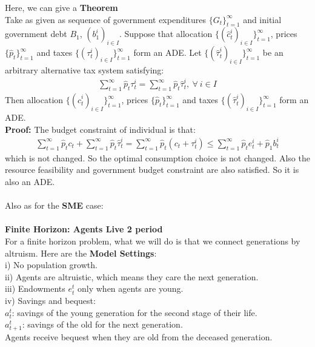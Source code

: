 \documentclass{article}
\begin{document}
Here, we can give a \textbf{Theorem}\\
Take as given as sequence of government expenditures $\{G_t\}^\infty_{t=1}$ and initial government debt $B_1$, $(b^i_1)_{i \in I}$. Suppose that allocation $\{(\hat{c}^i_t)_{i \in I}\}^\infty_{t=1}$, prices $\{\hat{p}_t\}^\infty_{t=1}$ and taxes $\{(\tau^i_t)_{i \in I}\}^\infty_{t=1}$ form an ADE. Let $\{(\hat{\tau}^i_t)_{i \in I}\}^\infty_{t=1}$ be an arbitrary alternative tax system satisfying:
	\begin{align*}
		\sum\limits^\infty_{t=1} \hat{p}_t \tau^i_t = \sum\limits^\infty_{t=1} \hat{p}_t \hat{\tau}^i_t,\ \forall\ i \in I 
	\end{align*}
Then allocation $\{(\hat{c}^i_t)_{i \in I}\}^\infty_{t=1}$, prices $\{\hat{p}_t\}^\infty_{t=1}$ and taxes $\{(\hat{\tau}^i_t)_{i \in I}\}^\infty_{t=1}$ form an ADE.\\
\textbf{Proof:}
The budget constraint of individual is that:
	\begin{align*}
		\sum\limits^\infty_{t=1} \hat{p}_t c_t + \sum\limits^\infty_{t=1} \hat{p}_t \hat{\tau}^i_t = \sum\limits^\infty_{t=1} \hat{p}_t(c_t + \tau^i_t) \leq \sum\limits^\infty_{t=1}\hat{p}_te^i_t + \hat{p}_1 b^i_t 
	\end{align*}
which is not changed. So the optimal consumption choice is not changed. Also the resource feasibility and government budget constraint are also satisfied. So it is also an ADE.\\\\
Also as for the \textbf{SME} case:\\\\
\textbf{Finite Horizon: Agents Live 2 period}\\
For a finite horizon problem, what we will do is that we connect generations by altruism. Here are the \textbf{Model Settings}:\\
\indent i) No population growth.\\
\indent ii) Agents are altruistic, which means they care the next generation.\\
\indent iii) Endowments $e^t_t$ only when agents are young.\\
\indent iv) Savings and bequest:\\
\indent\indent $a^t_t$: savings of the young generation for the second stage of their life.\\
\indent\indent $a^t_{t+1}$: savings of the old for the next generation.\\
\indent\indent Agents receive bequest when they are old from the deceased generation.\\
\end{document}
